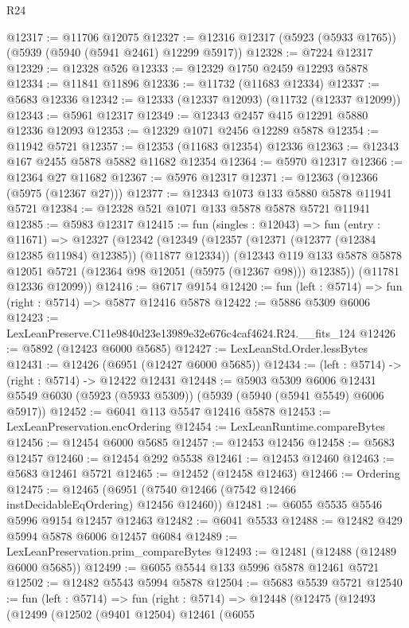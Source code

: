 \begin{lexlean}{R24}
\begin{coremodule}
@12317 := @11706 @12075
@12327 := @12316 @12317 (@5923 (@5933 @1765)) (@5939 (@5940 (@5941 @2461) @12299 @5917))
@12328 := @7224 @12317
@12329 := @12328 @526
@12333 := @12329 @1750 @2459 @12293 @5878
@12334 := @11841 @11896
@12336 := @11732 (@11683 @12334)
@12337 := @5683 @12336
@12342 := @12333 (@12337 @12093) (@11732 (@12337 @12099))
@12343 := @5961 @12317
@12349 := @12343 @2457 @415 @12291 @5880 @12336 @12093
@12353 := @12329 @1071 @2456 @12289 @5878
@12354 := @11942 @5721
@12357 := @12353 (@11683 @12354) @12336
@12363 := @12343 @167 @2455 @5878 @5882 @11682 @12354
@12364 := @5970 @12317
@12366 := @12364 @27 @11682
@12367 := @5976 @12317
@12371 := @12363 (@12366 (@5975 (@12367 @27)))
@12377 := @12343 @1073 @133 @5880 @5878 @11941 @5721
@12384 := @12328 @521 @1071 @133 @5878 @5878 @5721 @11941
@12385 := @5983 @12317
@12415 := fun (singles : @12043) =>
  fun (entry : @11671) =>
  @12327
    (@12342
      (@12349
        (@12357 (@12371 (@12377 (@12384 @12385 @11984) @12385)) (@11877 @12334))
        (@12343 @119 @133 @5878 @5878 @12051 @5721 (@12364 @98 @12051 (@5975 (@12367 @98))) @12385))
      (@11781 @12336 @12099))
@12416 := @6717 @9154
@12420 := fun (left : @5714) => fun (right : @5714) => @5877 @12416 @5878
@12422 := @5886 @5309 @6006
@12423 := LexLeanPreserve.C11e9840d23e13989e32e676c4caf4624.R24.__fits_124
@12426 := @5892 (@12423 @6000 @5685)
@12427 := LexLeanStd.Order.lessBytes
@12431 := @12426 (@6951 (@12427 @6000 @5685))
@12434 := (left : @5714) -> (right : @5714) -> @12422 @12431
@12448 := @5903
    @5309
    @6006
    @12431
    @5549
    @6030
    (@5923 (@5933 @5309))
    (@5939 (@5940 (@5941 @5549) @6006 @5917))
@12452 := @6041 @113 @5547 @12416 @5878
@12453 := LexLeanPreservation.encOrdering
@12454 := LexLeanRuntime.compareBytes
@12456 := @12454 @6000 @5685
@12457 := @12453 @12456
@12458 := @5683 @12457
@12460 := @12454 @292 @5538
@12461 := @12453 @12460
@12463 := @5683 @12461 @5721
@12465 := @12452 (@12458 @12463)
@12466 := Ordering
@12475 := @12465 (@6951 (@7540 @12466 (@7542 @12466 instDecidableEqOrdering) @12456 @12460))
@12481 := @6055 @5535 @5546 @5996 @9154 @12457 @12463
@12482 := @6041 @5533
@12488 := @12482 @429 @5994 @5878 @6006 @12457 @6084
@12489 := LexLeanPreservation.prim_compareBytes
@12493 := @12481 (@12488 (@12489 @6000 @5685))
@12499 := @6055 @5544 @133 @5996 @5878 @12461 @5721
@12502 := @12482 @5543 @5994 @5878
@12504 := @5683 @5539 @5721
@12540 := fun (left : @5714) =>
  fun (right : @5714) =>
  @12448
    (@12475
      (@12493
        (@12499
          (@12502
            (@9401 @12504)
            @12461
            (@6055

\end{coremodule}
\end{lexlean}
